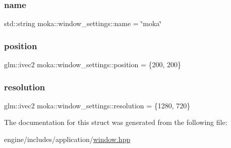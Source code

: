 \mbox{\label{structmoka_1_1window__settings_ad53068092b1bf791a0dfe35df846026b}} 
\subsubsection{\texorpdfstring{name}{name}}
{\footnotesize\ttfamily std\+::string moka\+::window\+\_\+settings\+::name = \char`\"{}moka\char`\"{}}

\mbox{\label{structmoka_1_1window__settings_a67d1e29d6707e634ee248f56edf1c2dc}} 
\subsubsection{\texorpdfstring{position}{position}}
{\footnotesize\ttfamily glm\+::ivec2 moka\+::window\+\_\+settings\+::position = \{200, 200\}}

\mbox{\label{structmoka_1_1window__settings_a660037db2bab0e3a2cbdf0ac65832096}} 
\subsubsection{\texorpdfstring{resolution}{resolution}}
{\footnotesize\ttfamily glm\+::ivec2 moka\+::window\+\_\+settings\+::resolution = \{1280, 720\}}



The documentation for this struct was generated from the following file\+:\begin{DoxyCompactItemize}
\item 
engine/includes/application/\mbox{\hyperlink{window_8hpp}{window.\+hpp}}\end{DoxyCompactItemize}
